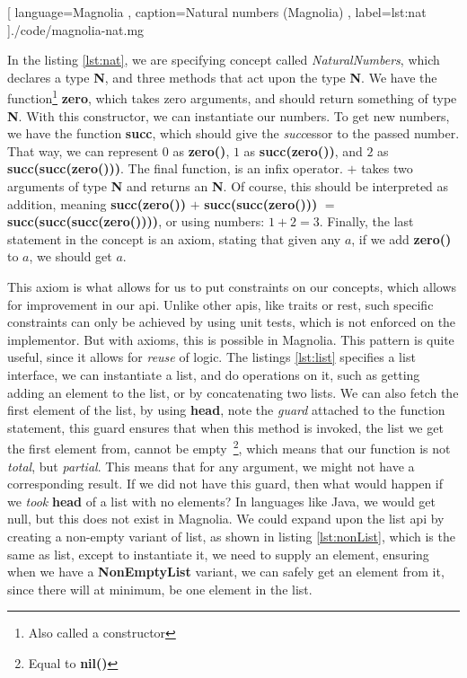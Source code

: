 \begin{center}
  
    [ language=Magnolia
    , caption={Natural numbers (Magnolia)}
    , label=lst:nat
    ]{./code/magnolia-nat.mg}
\end{center}

In the listing \ref{lst:nat}, we are specifying concept called
\textit{NaturalNumbers}, which declares a type \textbf{N}, and three methods
that act upon the type \textbf{N}. We have the function\footnote{Also called a constructor}
\textbf{zero}, which takes zero arguments, and should return something of type
\textbf{N}. With this constructor, we can instantiate our numbers. To get new
numbers, we have the function \textbf{succ}, which should give the
\textit{succ}essor to the passed number. That way, we can represent $0$ as
\textbf{zero()}, $1$ as \textbf{succ(zero())}, and $2$ as
\textbf{succ(succ(zero()))}. The final function, is an infix operator. $+$ takes
two arguments of type \textbf{N} and returns an \textbf{N}. Of course, this
should be interpreted as addition, meaning \textbf{succ(zero())} $+$
\textbf{succ(succ(zero()))} $=$ \textbf{succ(succ(succ(zero())))}, or using
numbers: $1 + 2 = 3$. Finally, the last statement in the concept is an axiom,
stating that given any $a$, if we add \textbf{zero()} to $a$, we should get $a$.

This axiom is what allows for us to put constraints on our concepts, which
allows for improvement in our \gls*{api}. Unlike other \gls*{api}s, like traits or
\gls*{rest}, such specific constraints can only be achieved by using unit tests,
which is not enforced on the implementor. But with axioms, this is possible in
Magnolia. This pattern is quite useful, since it allows for \textit{reuse} of
logic. The listings \ref{lst:list} specifies a list interface, we can
instantiate a list, and do operations on it, such as getting adding an element to
the list, or by concatenating two lists. We can also fetch the first element of
the list, by using \textbf{head}, note the \textit{guard} attached to the
function statement, this guard ensures that when this method is invoked, the
list we get the first element from, cannot be empty~\footnote{Equal to \textbf{nil()}},
which means that our function is not \textit{total}, but \textit{partial}. This
means that for any argument, we might not have a corresponding result. If we did
not have this guard, then what would happen if we \textit{took} \textbf{head} of a list
with no elements? In languages like Java, we would get null, but this does not
exist in Magnolia. We could expand upon the list \gls*{api} by creating a
non-empty variant of list, as shown in listing \ref{lst:nonList}, which is the
same as list, except to instantiate it, we need to supply an element, ensuring
when we have a \textbf{NonEmptyList} variant, we can safely get an element from
it, since there will at minimum, be one element in the list.

